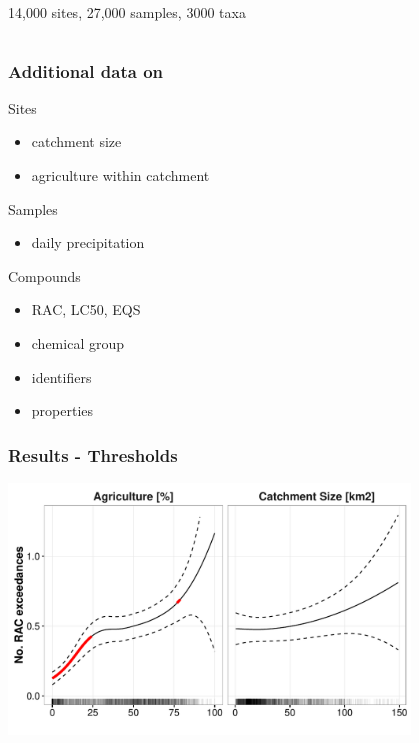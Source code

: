 \documentclass[12pt
, t
]{beamer}
\begin{document}
\begin{frame}
\begin{columns}[t]
	14,000 sites, 27,000 samples, 3000 taxa
	\end{columns}
\end{frame}


\begin{frame}
\frametitle{Additional data on}
	\textcolor{hilight}{Sites}
	\begin{itemize}
	\item catchment size
	\item agriculture within catchment
	\end{itemize}

	\pause
	\textcolor{hilight}{Samples}
	\begin{itemize}
	\item daily precipitation
	\end{itemize}

	\pause
	\textcolor{hilight}{Compounds}
	\begin{itemize}
	\item RAC, LC50, EQS
	\item chemical group
	\item identifiers
	\item properties
	\end{itemize}
\end{frame}



\begin{frame}
\frametitle{Results - Thresholds}
	\pause
	\begin{center}
		\includegraphics[width = 0.8\textwidth]{fig/figure4.pdf}
	\end{center}
\end{frame}
\end{document}
